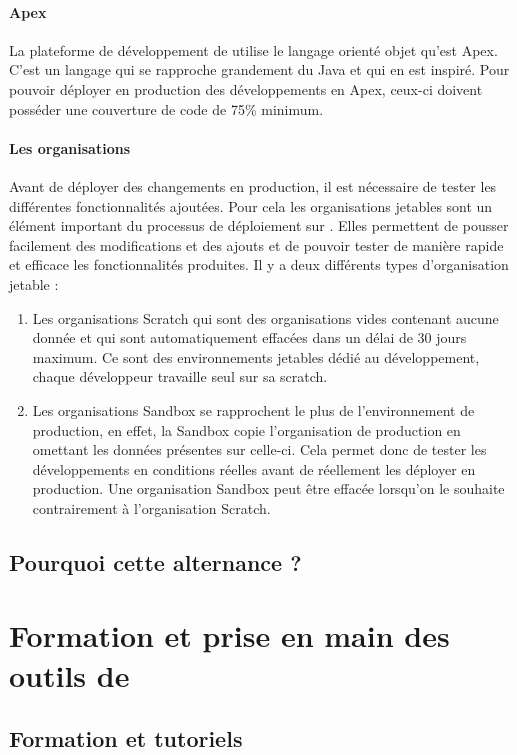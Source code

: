 \documentclass[12pt,oneside,noprintercorrection]{iut}
\begin{document}
\subsubsection{Apex}
La plateforme de développement de \slf{} utilise le langage orienté objet qu'est Apex. C'est un langage qui se rapproche grandement du Java et qui en est inspiré. Pour pouvoir déployer en production des développements en Apex, ceux-ci doivent posséder une couverture de code de 75\% minimum.

\subsubsection{Les organisations \slf{}}
Avant de déployer des changements en production, il est nécessaire de tester les différentes fonctionnalités ajoutées. Pour cela les organisations jetables sont un élément important du processus de déploiement sur \slf{}. Elles permettent de pousser facilement des modifications et des ajouts et de pouvoir tester de manière rapide et efficace les fonctionnalités produites. Il y a deux différents types d'organisation jetable :
\begin{enumerate}
    \item Les organisations Scratch
    qui sont des organisations vides contenant aucune donnée et qui sont automatiquement effacées dans un délai de 30 jours maximum. Ce sont des environnements jetables dédié au développement, chaque développeur travaille seul sur sa scratch.
    \item Les organisations Sandbox se rapprochent le plus de l'environnement de production, en effet, la Sandbox copie l'organisation de production en omettant les données présentes sur celle-ci. Cela permet donc de tester les développements en conditions réelles avant de réellement les déployer en production. Une organisation Sandbox peut être effacée lorsqu'on le souhaite contrairement à l'organisation Scratch.
\end{enumerate}

\section{Pourquoi cette alternance ?}

\chapter{Formation et prise en main des outils de \gz{}}
\section{Formation et tutoriels}
\end{document}
